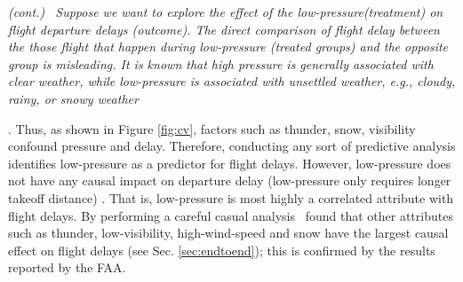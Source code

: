\begin{example} \em \delay (cont.) \ \em   Suppose we want to explore the effect of the low-pressure(treatment) on flight departure delays (outcome).  The direct comparison of 
flight delay between the those flight that happen during low-pressure (treated groups) and the opposite group is misleading.  It is known that high pressure is generally associated with clear weather,    while low-pressure is associated with unsettled weather, e.g.,
    cloudy, rainy, or snowy weather. Thus, as shown in Figure \ref{fig:cv}, factors such as thunder, snow, visibility confound pressure and delay. Therefore, conducting any sort of predictive analysis identifies
    low-pressure as a predictor for flight delays.
  However, low-pressure does not have any causal impact on departure delay
    (low-pressure only requires longer takeoff distance) \cite{FAA08}. That is, low-pressure is most highly a correlated attribute with flight delays. By performing a careful casual analysis
    \GSQL\ found that other attributes such as thunder, low-visibility, high-wind-speed and
    snow have the largest causal effect on flight delays (see Sec. \ref{sec:endtoend});
  this is confirmed by the results reported by the FAA.
\end{example}



\vspace{-0.1cm}


